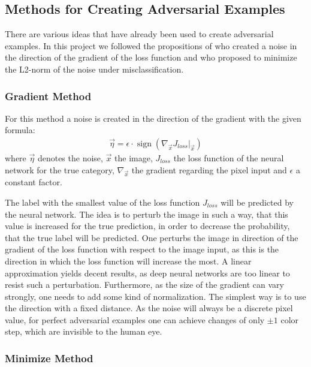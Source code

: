 \documentclass[%
 reprint,
 amsmath,amssymb,
 aps,
]{revtex4-1}
\begin{document}
\subsection{Methods for Creating Adversarial Examples}

There are various ideas that have already been used to create adversarial examples. In this project we followed the propositions of \citet{paperGrad} who created a noise in the direction of the gradient of the loss function and \citet{paperMinimize} who proposed to minimize the L2-norm of the noise under misclassification.
\subsubsection*{Gradient Method}

For this method a noise is created in the direction of the gradient with the given formula:
\begin{align*}
\vec{\eta} = \epsilon \cdot \operatorname{sign} \left( \nabla_{\vec{x}} J_{loss} \big \vert_{\vec{x}} \right)
\end{align*}
where $\vec{\eta}$ denotes the noise, $\vec{x}$ the image, $J_{loss}$ the loss function of the neural network for the true category,  $\nabla_{\vec{x}}$ the gradient regarding the pixel input and $\epsilon$ a constant factor.

The label with the smallest value of the loss function $J_{loss}$ will be predicted by the neural network. The idea is to perturb the image in such a way, that this value is increased for the true prediction, in order to decrease the probability, that the true label will be predicted. One perturbs the image in direction of the gradient of the loss function with respect to the image input, as this is the direction in which the loss function will increase the most. A linear approximation yields decent results, as deep neural networks are too linear to resist such a perturbation. Furthermore, as the size of the gradient can vary strongly, one needs to add some kind of normalization. The simplest way is to use the direction with a fixed distance. As the noise will always be a discrete pixel value, for perfect adversarial examples one can achieve changes of only $\pm 1$ color step, which are invisible to the human eye. \cite{paperGrad}

\subsubsection*{Minimize Method}
\end{document}
